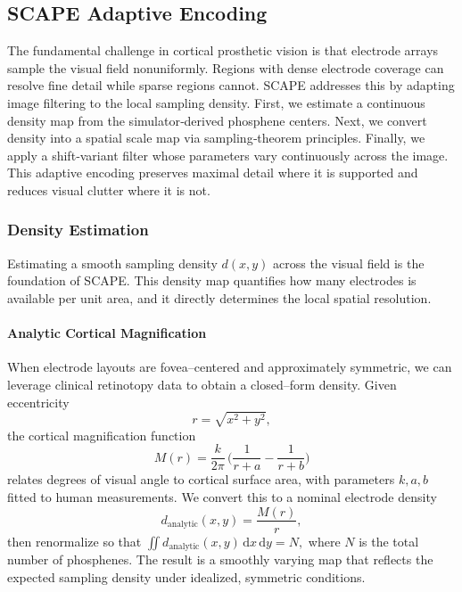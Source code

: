 \subsection{SCAPE Adaptive Encoding}
The fundamental challenge in cortical prosthetic vision is that electrode arrays sample the visual field nonuniformly. Regions with dense electrode coverage can resolve fine detail while sparse regions cannot. SCAPE addresses this by adapting image filtering to the local sampling density. First, we estimate a continuous density map from the simulator‐derived phosphene centers. Next, we convert density into a spatial scale map via sampling‐theorem principles. Finally, we apply a shift‐variant filter whose parameters vary continuously across the image. This adaptive encoding preserves maximal detail where it is supported and reduces visual clutter where it is not.


\subsubsection{Density Estimation}
Estimating a smooth sampling density \(d(x,y)\) across the visual field is the foundation of SCAPE. This density map quantifies how many electrodes is available per unit area, and it directly determines the local spatial resolution.

\paragraph{Analytic Cortical Magnification}
When electrode layouts are fovea–centered and approximately symmetric, we can leverage clinical retinotopy data \cite{vanderGrinten2024} to obtain a closed–form density. Given eccentricity 
\[
r = \sqrt{x^2 + y^2},
\] 
the cortical magnification function
\[
M(r) = \frac{k}{2\pi}\,\biggl(\frac{1}{r + a} - \frac{1}{r + b}\biggr)
\]
relates degrees of visual angle to cortical surface area, with parameters \(k,a,b\) fitted to human measurements. We convert this to a nominal electrode density
\[
d_{\mathrm{analytic}}(x,y) = \frac{M(r)}{r},
\]
then renormalize so that
$
\iint d_{\mathrm{analytic}}(x,y)\,\mathrm{d}x\,\mathrm{d}y = N,
$
where \(N\) is the total number of phosphenes. The result is a smoothly varying map that reflects the expected sampling density under idealized, symmetric conditions.

